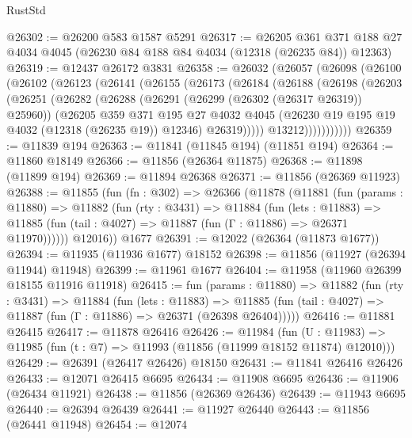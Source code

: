\begin{lexlean}{RustStd}
\begin{coremodule}
@26302 := @26200 @583 @1587 @5291
@26317 := @26205
    @361
    @371
    @188
    @27
    @4034
    @4045
    (@26230 @84 @188 @84 @4034 (@12318 (@26235 @84)) @12363)
@26319 := @12437 @26172 @3831
@26358 := @26032
    (@26057
      (@26098
        (@26100
          (@26102
            (@26123
              (@26141
                (@26155
                  (@26173
                    (@26184
                      (@26188
                        (@26198
                          (@26203
                            (@26251
                              (@26282
                                (@26288
                                  (@26291 (@26299 (@26302 (@26317 @26319)) @25960))
                                  (@26205
                                    @359
                                    @371
                                    @195
                                    @27
                                    @4032
                                    @4045
                                    (@26230 @19 @195 @19 @4032 (@12318 (@26235 @19)) @12346)
                                    @26319)))))
                          @13212)))))))))))
@26359 := @11839 @194
@26363 := @11841 (@11845 @194) (@11851 @194)
@26364 := @11860 @18149
@26366 := @11856 (@26364 @11875)
@26368 := @11898 (@11899 @194)
@26369 := @11894 @26368
@26371 := @11856 (@26369 @11923)
@26388 := @11855
    (fun (fn : @302) =>
    @26366
      (@11878
        (@11881
          (fun (params : @11880) =>
          @11882
            (fun (rty : @3431) =>
            @11884
              (fun (lets : @11883) =>
              @11885 (fun (tail : @4027) => @11887 (fun (Γ : @11886) => @26371 @11970))))))
        @12016))
    @1677
@26391 := @12022 (@26364 (@11873 @1677))
@26394 := @11935 (@11936 @1677) @18152
@26398 := @11856 (@11927 (@26394 @11944) @11948)
@26399 := @11961 @1677
@26404 := @11958 (@11960 @26399 @18155 @11916 @11918)
@26415 := fun (params : @11880) =>
  @11882
    (fun (rty : @3431) =>
    @11884
      (fun (lets : @11883) =>
      @11885 (fun (tail : @4027) => @11887 (fun (Γ : @11886) => @26371 (@26398 @26404)))))
@26416 := @11881 @26415
@26417 := @11878 @26416
@26426 := @11984
    (fun (U : @11983) => @11985 (fun (t : @7) => @11993 (@11856 (@11999 @18152 @11874) @12010)))
@26429 := @26391 (@26417 @26426) @18150
@26431 := @11841 @26416 @26426
@26433 := @12071 @26415 @6695
@26434 := @11908 @6695
@26436 := @11906 (@26434 @11921)
@26438 := @11856 (@26369 @26436)
@26439 := @11943 @6695
@26440 := @26394 @26439
@26441 := @11927 @26440
@26443 := @11856 (@26441 @11948)
@26454 := @12074

\end{coremodule}
\end{lexlean}
